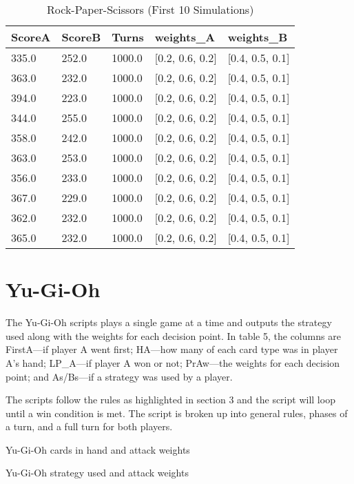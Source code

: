 \FloatBarrier
\begin{table}[]
\caption{Rock-Paper-Scissors (First 10 Simulations)}
\begin{tabular}{lllll}
\hline
ScoreA & ScoreB & Turns  & weights\_A          & weights\_B          \\
\hline
335.0  & 252.0  & 1000.0 & {[}0.2, 0.6, 0.2{]} & {[}0.4, 0.5, 0.1{]} \\
363.0  & 232.0  & 1000.0 & {[}0.2, 0.6, 0.2{]} & {[}0.4, 0.5, 0.1{]} \\
394.0  & 223.0  & 1000.0 & {[}0.2, 0.6, 0.2{]} & {[}0.4, 0.5, 0.1{]} \\
344.0  & 255.0  & 1000.0 & {[}0.2, 0.6, 0.2{]} & {[}0.4, 0.5, 0.1{]} \\
358.0  & 242.0  & 1000.0 & {[}0.2, 0.6, 0.2{]} & {[}0.4, 0.5, 0.1{]} \\
363.0  & 253.0  & 1000.0 & {[}0.2, 0.6, 0.2{]} & {[}0.4, 0.5, 0.1{]} \\
356.0  & 233.0  & 1000.0 & {[}0.2, 0.6, 0.2{]} & {[}0.4, 0.5, 0.1{]} \\
367.0  & 229.0  & 1000.0 & {[}0.2, 0.6, 0.2{]} & {[}0.4, 0.5, 0.1{]} \\
362.0  & 232.0  & 1000.0 & {[}0.2, 0.6, 0.2{]} & {[}0.4, 0.5, 0.1{]} \\
365.0  & 232.0  & 1000.0 & {[}0.2, 0.6, 0.2{]} & {[}0.4, 0.5, 0.1{]} \\
\hline
\end{tabular}
\end{table}

\FloatBarrier
\section{Yu-Gi-Oh}








The Yu-Gi-Oh scripts plays a single game at a time and outputs the strategy used along with the weights for each decision point. In table 5, the columns are FirstA---if player A went first; HA---how many of each card type was in player A's hand; LP\_A---if player A won or not; PrAw---the weights for each decision point; and As/Bs---if a strategy was used by a player. 

The scripts follow the rules as highlighted in section 3 and the script will loop until a win condition is met. The script is broken up into general rules, phases of a turn, and a full turn for both players.


\FloatBarrier
{\footnotesize
\begin{table}[]
\caption{Yu-Gi-Oh cards in hand and attack weights}

\end{table}
}
{
\begin{table}[]
\caption{Yu-Gi-Oh strategy used and attack weights}
\scriptsize

\end{table}
}



